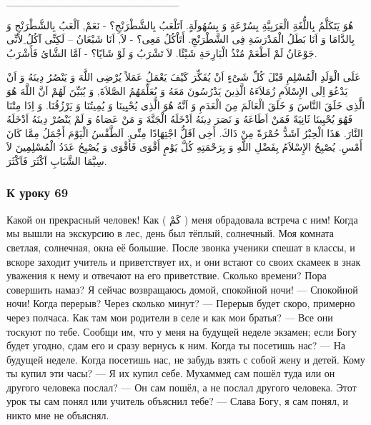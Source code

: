 \documentclass[a5paper]{article}
\begin{document}
\_\_\_\_\_\_\_\_\_\_\_\_\_\_\_\_\_\_\_\_\_\_\_

هُوَ يَتَكَلَّمُ بِاللُّغَةِ الْعَرَبِيَّةِ بِسُرْعَةٍ وَ بِسُهُولَةٍ. اَتَلْعَبُ بِالشَّطْرَنْجِ؟ - نَعَمْ, اَلْعَبُ بِالشَّطْرَنْجِ وَ بِالدَّامَا وَ اَنَا بَطَلُ الْمَدْرَسَةِ فِى الشَّطْرَنْجِ. أَتَاْكُلُ مَعِى؟ - لاَ, اَنَا شَبْعَانُ – لَكِنِّى آكُلُ ِلاَنِّى جَوْعَانُ لَمْ اَطْعَمْ مُنْذُ الْبَارِحَةِ شَيْئًا. لاَ تَشْرَبُ وَ لَوْ شَايًا؟ - اَمَّا الشَّاىُ فَأَشْرَبُ.

عَلَى الْوَلَدِ الْمُسْلِمِ قَبْلَ كُلِّ شَىْءٍ اَنْ يُفَكِّرَ كَيْفَ يَعْمَلُ عَمَلاً يُرْضِى اللَّهَ وَ يَنْصُرُ دِينَهُ وَ اَنْ يَدْعُوَ اِلَى الإِسْلاَمِ زُمَلاَءَهُ الَّذِينَ يَدْرُسُونَ مَعَهُ وَ يُعَلِّمَهُمُ الصَّلاَةَ, وَ يُبَيِّنَ لَهُمْ اَنَّ اللَّهَ هُوَ الَّذِى خَلَقَ النَّاسَ وَ خَلَقَ الْعَالَمَ مِنَ الْعَدَمِ وَ اَنَّهُ هُوَ الَّذِى يُحْيِينَا وَ يُمِيتُنَا وَ يَرْزُقُنَا. وَ اِذَا مِتْنَا فَهُوَ يُحْيِينَا ثَانِيَةً فَمَنْ اَطَاعَهُ وَ نَصَرَ دِينَهُ اَدْخَلَهُ الْجَنَّةَ وَ مَنْ عَصَاهُ وَ لَمْ يَنْصُرْ دِينَهُ اَدْخَلَهُ النَّارَ. هَذَا الْحِبْرُ اَشَدُّ حُمْرَةً مِنْ ذَاكَ. أَخِى اَقَلُّ اجْتِهَادًا مِنِّى. اَلطَّقْسُ الْيَوْمَ أَجْمَلُ مِمَّا كَانَ أَمْسِ. يُصْبِحُ الإِسْلاَمُ بِفَضْلِ اللَّهِ وَ بِرَحْمَتِهِ كُلَّ يَوْمٍ أَقْوَى فَأَقْوَى وَ يُصْبِحُ عَدَدُ الْمُسْلِمِينَ لاَ سِيَّمَا الشَّبَابِ اَكْثَرَ فَاَكْثَرَ.

\subsubsection{К уроку 69}
Какой он прекрасный человек! Как ( كَمْ ) меня обрадовала встреча с ним! Когда мы вышли на экскурсию в лес, день был тёплый, солнечный. Моя комната светлая, солнечная, окна её большие. После звонка ученики спешат в классы, и вскоре заходит учитель и приветствует их, и они встают со своих скамеек в знак уважения к нему и отвечают на его приветствие. Сколько времени? Пора совершить намаз? Я сейчас возвращаюсь домой, спокойной ночи! — Спокойной ночи! Когда перерыв? Через сколько минут? — Перерыв будет скоро, примерно через полчаса. Как там мои родители в селе и как мои братья? — Все они тоскуют по тебе. Сообщи им, что у меня на будущей неделе экзамен; если Богу будет угодно, сдам его и сразу вернусь к ним. Когда ты посетишь нас? — На будущей неделе. Когда посетишь нас, не забудь взять с собой жену и детей. Кому ты купил эти часы? — Я их купил себе. Мухаммед сам пошёл туда или он другого человека послал? — Он сам пошёл, а не послал другого человека. Этот урок ты сам понял или учитель объяснил тебе? — Слава Богу, я сам понял, и никто мне не объяснял.
\end{document}
